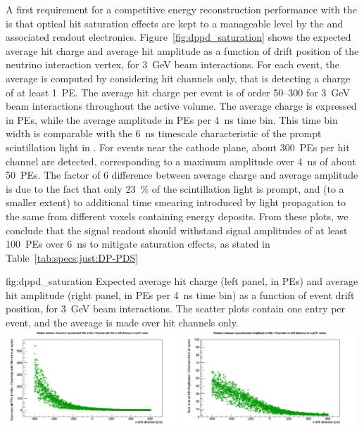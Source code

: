 A first requirement for a competitive energy reconstruction performance with the  is that optical hit saturation effects are kept to a manageable level by the  and associated readout electronics. Figure~\ref{fig:dppd_saturation} shows the expected average hit charge and average hit amplitude as a function of drift position of the neutrino interaction vertex, for \SI{3}{\GeV} beam \nue {} interactions. For each event, the average is computed by considering hit  channels only, that is  detecting a charge of at least \SI{1}{PE}. The average hit charge per event is of order \SIrange{50}{300}{} for \SI{3}{\GeV} beam \nue {} interactions throughout the  active volume. The average charge is expressed in PEs, while the average amplitude in PEs per \SI{4}{\nano\s} time bin. This time bin width is comparable with the \SI{6}{\nano\s} timescale characteristic of the prompt scintillation light in . For events near the cathode plane, about \SI{300}{PEs} per hit channel are detected, corresponding to a maximum amplitude over \SI{4}{\nano\s} of about \SI{50}{PEs}. The factor of 6 difference between average charge and average amplitude is due to the fact that only \SI{23}{\%} of the scintillation light is prompt, and (to a smaller extent) to additional time smearing introduced by light propagation to the same  from different  voxels containing energy deposits. From these plots, we conclude that the  signal readout should withstand signal amplitudes of at least \SI{100}{PEs} over \SI{6}{\nano\s} to mitigate saturation effects, as stated in Table~\ref{tab:specs:just:DP-PDS}

\begin{dunefigure}{fig:dppd_saturation}
{Expected average hit charge (left panel, in PEs) and average hit amplitude (right panel, in PEs per \SI{4}{\nano\s} time bin) as a function of event drift position, for \SI{3}{\GeV} beam \nue {} interactions. The scatter plots  contain one entry per event, and the average is made over hit  channels only.}
\includegraphics[trim={0cm 0cm 0cm 1.cm}, clip, width=0.49\textwidth]{graphics/dppd_avg_charge_per_channel.pdf} \hfill
\includegraphics[trim={0cm 0cm 0cm 1.cm}, clip, width=0.49\textwidth]{graphics/dppd_avg_amplitude_per_channel.pdf}
\end{dunefigure}


